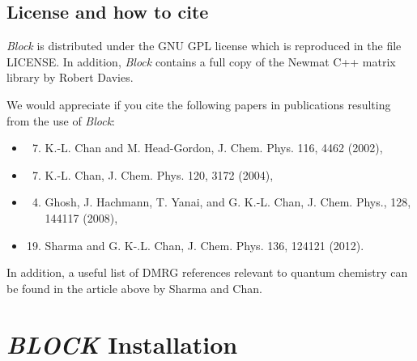 \documentclass[letterpaper,10pt,english]{sphinxmanual}
\begin{document}
\subsection{License and how to cite}
\label{overview:license-and-how-to-cite}
\emph{Block} is distributed under the GNU GPL license which is reproduced in the file LICENSE.
In addition, \emph{Block} contains a full copy of the Newmat C++ matrix library by Robert Davies.

We would appreciate if you cite the following papers in publications resulting from the
use of \emph{Block}:
\begin{itemize}
\item {} \begin{enumerate}
\setcounter{enumi}{6}
\item {} 
K.-L. Chan and M. Head-Gordon, J. Chem. Phys. 116, 4462 (2002),

\end{enumerate}

\item {} \begin{enumerate}
\setcounter{enumi}{6}
\item {} 
K.-L. Chan, J. Chem. Phys. 120, 3172 (2004),

\end{enumerate}

\item {} \begin{enumerate}
\setcounter{enumi}{3}
\item {} 
Ghosh, J. Hachmann, T. Yanai, and G. K.-L. Chan, J. Chem. Phys., 128, 144117 (2008),

\end{enumerate}

\item {} \begin{enumerate}
\setcounter{enumi}{18}
\item {} 
Sharma and G. K-.L. Chan, J. Chem. Phys. 136, 124121 (2012).

\end{enumerate}

\end{itemize}

In addition, a useful list of DMRG references relevant to quantum chemistry can be found
in the article above by Sharma and Chan.


\section{\emph{BLOCK} Installation}
\label{build::doc}\label{build:block-installation}
\end{document}
